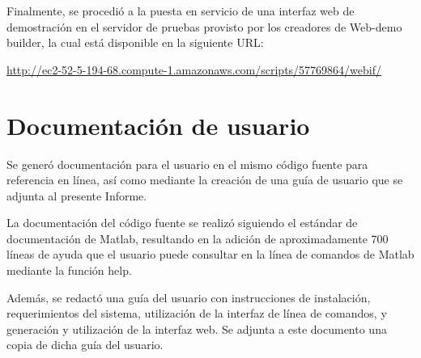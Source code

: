 \documentclass[12pt,bibliography=oldstyle,DIV=12,parskip=half-]{scrreprt}
\begin{document}
Finalmente, se procedió a la puesta en servicio de una interfaz web de
demostración en el servidor de pruebas provisto por los creadores de
Web-demo builder, la cual está disponible en la siguiente URL:

\url{http://ec2-52-5-194-68.compute-1.amazonaws.com/scripts/57769864/webif/}
%
%
\section{Documentación de usuario}
%
Se generó documentación para el usuario en el mismo código fuente para
referencia en línea, así como mediante la creación de una guía de
usuario que se adjunta al presente Informe.

La documentación del código fuente se realizó siguiendo el estándar de
documentación de Matlab, resultando en la adición de aproximadamente
700 líneas de ayuda que el usuario puede consultar en la línea de
comandos de Matlab mediante la función {\mono help}.

Además, se redactó una guía del usuario con instrucciones de
instalación, requerimientos del sistema, utilización de la interfaz de
línea de comandos, y generación y utilización de la interfaz web.  Se
adjunta a este documento una copia de dicha guía del usuario.
%
%
%
\renewcommand{\bibfont}{\normalfont\footnotesize}
\printbibliography
\end{document}
